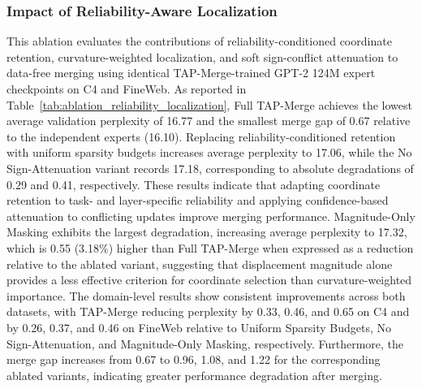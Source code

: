 \documentclass[fleqn,10pt]{wlscirep}
\begin{document}
\subsubsection{Impact of Reliability-Aware Localization}
\label{subsec:ablation_reliability_localization}
This ablation evaluates the contributions of reliability-conditioned coordinate retention, curvature-weighted localization, and soft sign-conflict attenuation to data-free merging using identical TAP-Merge-trained GPT-2 124M expert checkpoints on C4 and FineWeb. As reported in Table~\ref{tab:ablation_reliability_localization}, Full TAP-Merge achieves the lowest average validation perplexity of 16.77 and the smallest merge gap of 0.67 relative to the independent experts (16.10). Replacing reliability-conditioned retention with uniform sparsity budgets increases average perplexity to 17.06, while the No Sign-Attenuation variant records 17.18, corresponding to absolute degradations of 0.29 and 0.41, respectively. These results indicate that adapting coordinate retention to task- and layer-specific reliability and applying confidence-based attenuation to conflicting updates improve merging performance. Magnitude-Only Masking exhibits the largest degradation, increasing average perplexity to 17.32, which is 0.55 (3.18\%) higher than Full TAP-Merge when expressed as a reduction relative to the ablated variant, suggesting that displacement magnitude alone provides a less effective criterion for coordinate selection than curvature-weighted importance. The domain-level results show consistent improvements across both datasets, with TAP-Merge reducing perplexity by 0.33, 0.46, and 0.65 on C4 and by 0.26, 0.37, and 0.46 on FineWeb relative to Uniform Sparsity Budgets, No Sign-Attenuation, and Magnitude-Only Masking, respectively. Furthermore, the merge gap increases from 0.67 to 0.96, 1.08, and 1.22 for the corresponding ablated variants, indicating greater performance degradation after merging.
\end{document}

